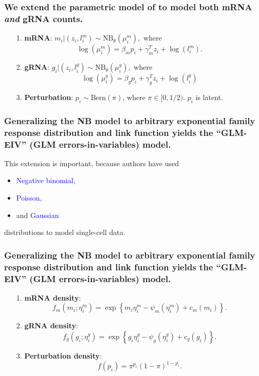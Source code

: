 \documentclass{beamer}
\begin{document}
\begin{frame}
\frametitle{We extend the parametric model of \cite{Sarkar2021} to model both mRNA \textit{and} gRNA counts.}
\begin{itemize}
\item[1.] \textbf{mRNA}: $m_i | (z_i, l_i^m) \sim \textrm{NB}_\theta(\mu^m_i),$ where $$ \log\left( \mu^m_i \right) = \beta_m p_i + \gamma_m^T z_i + \log(l^m_i).$$
\item[2.] \textbf{gRNA}: $g_i | (z_i, l_i^g) \sim \textrm{NB}_\theta (\mu_i^g),$ where $$\log(\mu_i^g) = \beta_g p_i + \gamma_g^T z_i + \log(l_i^g)$$
\item[3.] \textbf{Perturbation}: $p_i \sim \textrm{Bern}(\pi)$, where $\pi \in [0, 1/2)$. $p_i$ is latent.
\end{itemize}
\end{frame}

\begin{frame}
\frametitle{Generalizing the NB model to arbitrary exponential family response distribution and link function yields the ``GLM-EIV'' (GLM errors-in-variables) model.}

This extension is important, because authors have used
 \begin{itemize}
 \item \textcolor{blue}{Negative binomial}, \cite{Choudhary2021}
 \item \textcolor{blue}{Poisson}, \cite{Schraivogel2020}
 \item and \textcolor{blue}{Gaussian} \cite{Lin2021}
 \end{itemize}
distributions to model single-cell data.
\end{frame}


\begin{frame}
\frametitle{Generalizing the NB model to arbitrary exponential family response distribution and link function yields the ``GLM-EIV'' (GLM errors-in-variables) model.}

\begin{itemize}
\item[1.] \textbf{mRNA density}: $$f_m(m_i; \eta^m_i) = \exp\left\{m_i \eta_i^m - \psi_m(\eta_i^m) + c_m(m_i) \right\}.$$
\item[2.] \textbf{gRNA density}: $$f_g(g_i; \eta^g_i) = \exp\left\{ g_i \eta_i^g - \psi_g(\eta_i^g) + c_g(g_i) \right\}.$$
\item[3.] \textbf{Perturbation density}: $$ f(p_i) = \pi^{p_i} (1-\pi)^{1-p_i}.$$
\end{itemize}
\end{frame}
\end{document}
